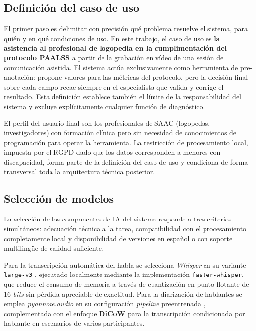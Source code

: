 \subsection{Definición del caso de uso}
\label{subsec:caso_uso}

El primer paso es delimitar con precisión qué problema resuelve el sistema, para quién
y en qué condiciones de uso. En este trabajo, el caso de uso es \textbf{la asistencia al
profesional de logopedia en la cumplimentación del protocolo \ac{PAALSS}} a partir de
la grabación en vídeo de una sesión de comunicación asistida. El sistema actúa
exclusivamente como herramienta de pre-anotación: propone valores para las métricas del
protocolo, pero la decisión final sobre cada campo recae siempre en el especialista
que valida y corrige el resultado. Esta definición establece también el límite de la
responsabilidad del sistema y excluye explícitamente cualquier función de diagnóstico.

El perfil del usuario final son los profesionales de \ac{SAAC} (logopedas,
investigadores) con formación clínica pero sin necesidad de conocimientos de
programación para operar la herramienta. La restricción de procesamiento local, impuesta
por el \ac{RGPD} dado que los datos corresponden a menores con discapacidad, forma parte
de la definición del caso de uso y condiciona de forma transversal toda la arquitectura
técnica posterior.


\subsection{Selección de modelos}
\label{subsec:seleccion_modelos}

La selección de los componentes de \ac{IA} del sistema responde a tres criterios
simultáneos: adecuación técnica a la tarea, compatibilidad con el procesamiento
completamente local y disponibilidad de versiones en español o con soporte multilingüe
de calidad suficiente.

Para la transcripción automática del habla se selecciona \emph{Whisper} en su variante
\texttt{large-v3} \cite{whisper_radford2023}, ejecutado localmente mediante la
implementación \texttt{faster-whisper}, que reduce el consumo de memoria a través de
cuantización en punto flotante de 16 \emph{bits} sin pérdida apreciable de exactitud. Para la
diarización de hablantes se emplea \emph{pyannote.audio} en su configuración
\emph{pipeline} preentrenada \cite{pyannote_plaquet2023}, complementada con el enfoque
\textbf{DiCoW} \cite{dicow_diarization} para la transcripción condicionada por hablante
en escenarios de varios participantes.


